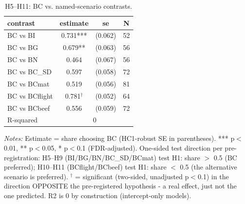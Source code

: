 \begin{table}[H]
    \centering
    \caption{H5--H11: BC vs. named-scenario contrasts.}
    \begin{tabular}{ l c c c }
\hline \hline
contrast & estimate & se & N \\
\hline
\hspace{0.05cm} BC vs BI & 0.731*** & (0.062) & 52 \\
\hspace{0.05cm} BC vs BG & 0.679** & (0.063) & 56 \\
\hspace{0.05cm} BC vs BN & 0.464 & (0.067) & 56 \\
\hspace{0.05cm} BC vs BC\_SD & 0.597 & (0.058) & 72 \\
\hspace{0.05cm} BC vs BCmat & 0.519 & (0.056) & 81 \\
\hspace{0.05cm} BC vs BCflight & 0.781$^\dagger$ & (0.052) & 64 \\
\hspace{0.05cm} BC vs BCbeef & 0.556 & (0.059) & 72 \\
\hline
\hspace{0.05cm} R-squared & \multicolumn{3}{c}{0} \\
\hline \hline
\end{tabular}
\begin{tablenotes}
\small
\item \textit{Notes:} Estimate = share choosing BC (HC1-robust SE in parentheses). *** p$<$0.01, ** p$<$0.05, * p$<$0.1 (FDR-adjusted). One-sided test direction per pre-registration: H5--H9 (BI/BG/BN/BC\_SD/BCmat) test H1: share $>$ 0.5 (BC preferred); H10--H11 (BCflight/BCbeef) test H1: share $<$ 0.5 (the alternative scenario is preferred). $^\dagger$ = significant (two-sided, unadjusted p$<$0.1) in the direction OPPOSITE the pre-registered hypothesis - a real effect, just not the one predicted. R2 is 0 by construction (intercept-only models).
\end{tablenotes}
    \label{tab:results_h5h11}
\end{table}
